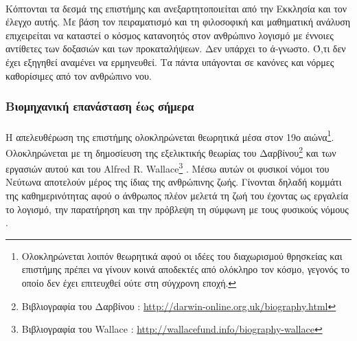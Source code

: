 \documentclass[a4paper,12pt,twoside]{report}
\begin{document}
{			\paragraph{}{Κόπτονται τα δεσμά της επιστήμης και ανεξαρτητοποιείται από την Εκκλησία και τον έλεγχο αυτής. Με βάση τον πειραματισμό και τη φιλοσοφική και μαθηματική ανάλυση επιχειρείται να καταστεί ο κόσμος κατανοητός στον ανθρώπινο λογισμό με έννοιες αντίθετες των δοξασιών και των προκαταλήψεων. Δεν υπάρχει το ά-γνωστο. Ό,τι δεν έχει εξηγηθεί αναμένει να ερμηνευθεί. Τα πάντα υπάγονται σε κανόνες και νόρμες καθορίσιμες από τον ανθρώπινο νου.
			}
		
		\subsubsection{Βιομηχανική επανάσταση έως σήμερα}		
			\paragraph{}{Η απελευθέρωση της επιστήμης ολοκληρώνεται θεωρητικά μέσα στον 19ο αιώνα\footnote{Ολοκληρώνεται λοιπόν θεωρητικά αφού οι ιδέες του διαχωρισμού θρησκείας και επιστήμης πρέπει να γίνουν κοινά αποδεκτές από ολόκληρο τον κόσμο, γεγονός το οποίο δεν έχει επιτευχθεί ούτε στη σύγχρονη εποχή.}. Ολοκληρώνεται με τη δημοσίευση της εξελικτικής θεωρίας \cite{OriginOfSpecies:Darwin1859} του Δαρβίνου\footnote{Βιβλιογραφία του Δαρβίνου : \url{http://darwin-online.org.uk/biography.html}} και των εργασιών αυτού και του Alfred R. Wallace\footnote{Βιβλιογραφία του Wallace : \url{http://wallacefund.info/biography-wallace}} \cite{OnTheLawWhichHasRegulatedTheIntroductionOfNewSpecies:Wallace1840}. Μέσω αυτών οι φυσικοί νόμοι του Νεύτωνα αποτελούν μέρος της ίδιας της ανθρώπινης ζωής. Γίνονται δηλαδή κομμάτι της καθημερινότητας αφού ο άνθρωπος πλέον μελετά τη ζωή του έχοντας ως εργαλεία το λογισμό, την παρατήρηση και την πρόβλεψη τη σύμφωνη με τους φυσικούς νόμους \cite{GeneralSystemsTheory:Skyttner2005}.
			}
			
}
\end{document}
